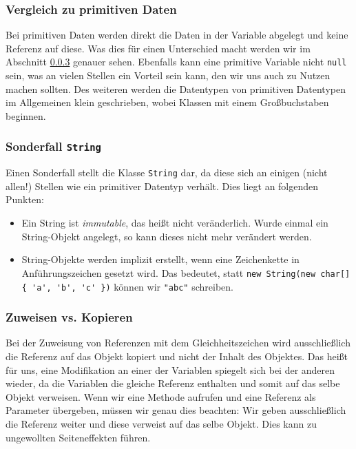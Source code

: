 	
	\subsubsection{Vergleich zu primitiven Daten}
		Bei primitiven Daten werden direkt die Daten in der Variable abgelegt und keine Referenz auf diese. Was dies für einen Unterschied macht werden wir im Abschnitt \ref{sec:assign_copy} genauer sehen. Ebenfalls kann eine primitive Variable nicht \lstinline|null| sein, was an vielen Stellen ein Vorteil sein kann, den wir uns auch zu Nutzen machen sollten. Des weiteren werden die Datentypen von primitiven Datentypen im Allgemeinen klein geschrieben, wobei Klassen mit einem Großbuchstaben beginnen.
	
	\subsubsection{Sonderfall \texttt{String}}
		Einen Sonderfall stellt die Klasse \lstinline|String| dar, da diese sich an einigen (nicht allen!) Stellen wie ein primitiver Datentyp verhält. Dies liegt an folgenden Punkten:
		\begin{itemize}
			\item Ein String ist \textit{immutable}, das heißt nicht veränderlich. Wurde einmal ein String-Objekt angelegt, so kann dieses nicht mehr verändert werden.
			\item String-Objekte werden implizit erstellt, wenn eine Zeichenkette in Anführungszeichen gesetzt wird. Das bedeutet, statt \lstinline|new String(new char[] { 'a', 'b', 'c' })| können wir \lstinline|"abc"| schreiben.
		\end{itemize}
	
	
	\subsubsection{Zuweisen vs. Kopieren}
		\label{sec:assign_copy}
		
		Bei der Zuweisung von Referenzen mit dem Gleichheitszeichen wird ausschließlich die Referenz auf das Objekt kopiert und nicht der Inhalt des Objektes. Das heißt für uns, eine Modifikation an einer der Variablen spiegelt sich bei der anderen wieder, da die Variablen die gleiche Referenz enthalten und somit auf das selbe Objekt verweisen. Wenn wir eine Methode aufrufen und eine Referenz als Parameter übergeben, müssen wir genau dies beachten: Wir geben ausschließlich die Referenz weiter und diese verweist auf das selbe Objekt. Dies kann zu ungewollten Seiteneffekten führen.
		
